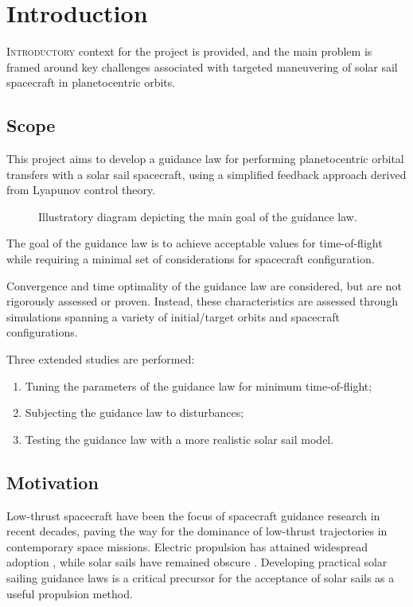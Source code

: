\chapter{Introduction}
\label{chp:introduction}

\lettrine{I}{ntroductory} context for the project is provided, and the main problem is framed around key challenges associated with targeted maneuvering of solar sail spacecraft in planetocentric orbits.

\section{Scope}
This project aims to develop a guidance law for performing planetocentric orbital transfers with a solar sail spacecraft, using a simplified feedback approach derived from Lyapunov control theory.

\begin{figure}[H]
  \centering
  
  \caption{Illustratory diagram depicting the main goal of the guidance law.}
  \label{fig:intro_diagram}
\end{figure}



The goal of the guidance law is to achieve acceptable values for time-of-flight while requiring a minimal set of considerations for spacecraft configuration.

Convergence and time optimality of the guidance law are considered, but are not rigorously assessed or proven. Instead, these characteristics are assessed through simulations spanning a variety of initial/target orbits and spacecraft configurations.

Three extended studies are performed:
\begin{enumerate}
  \item Tuning the parameters of the guidance law for minimum time-of-flight;
  \item Subjecting the guidance law to disturbances;
  \item Testing the guidance law with a more realistic solar sail model.
\end{enumerate}

\section{Motivation}
Low-thrust spacecraft have been the focus of spacecraft guidance research in recent decades, paving the way for the dominance of low-thrust trajectories in contemporary space missions. Electric propulsion has attained widespread adoption \cite{lev2019technological, spencer2021lightsail}, while solar sails have remained obscure \cite{mori2010first}. Developing practical solar sailing guidance laws is a critical precursor for the acceptance of solar sails as a useful propulsion method.

